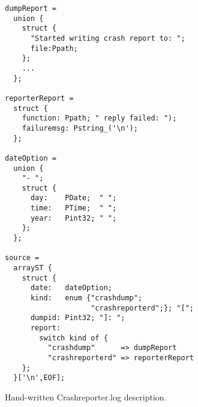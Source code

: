 \begin{figure}[t]
\begin{small}
\begin{verbatim}
dumpReport =
  union {
    struct {
      "Started writing crash report to: "; 
      file:Ppath;
    };
    ...
  };

reporterReport =
  struct {
    function: Ppath; " reply failed: ");
    failuremsg: Pstring_('\n'); 
  };

dateOption = 
  union {
    "- ";
    struct {
      day:    PDate;  " ";
      time:   PTime;  " ";
      year:   Pint32; " ";
    };
  };

source =
  arrayST {
    struct {
      date:   dateOption;
      kind:   enum {"crashdump"; 
                    "crashreporterd";}; "[";
      dumpid: Pint32; "]: ";
      report: 
        switch kind of {
          "crashdump"      => dumpReport
          "crashreporterd" => reporterReport
    };
  }['\n',EOF];
\end{verbatim}
\end{small}
\caption{Hand-written \ir{} Crashreporter.log description.} \shrink
\label{fig:crashreporter:ir}
\end{figure}


